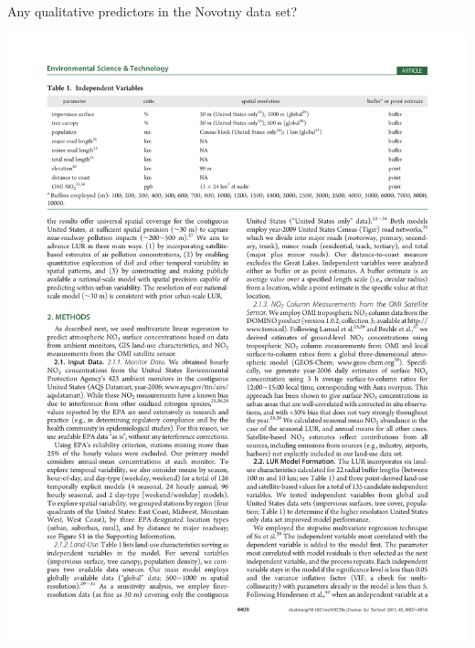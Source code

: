 \documentclass[aspectratio=169]{beamer}
\begin{document}
\begin{frame}{Any qualitative predictors in the Novotny data set?}

\includegraphics[height=0.5\textheight]{novotny_tab1_1}

\end{frame}
\end{document}
